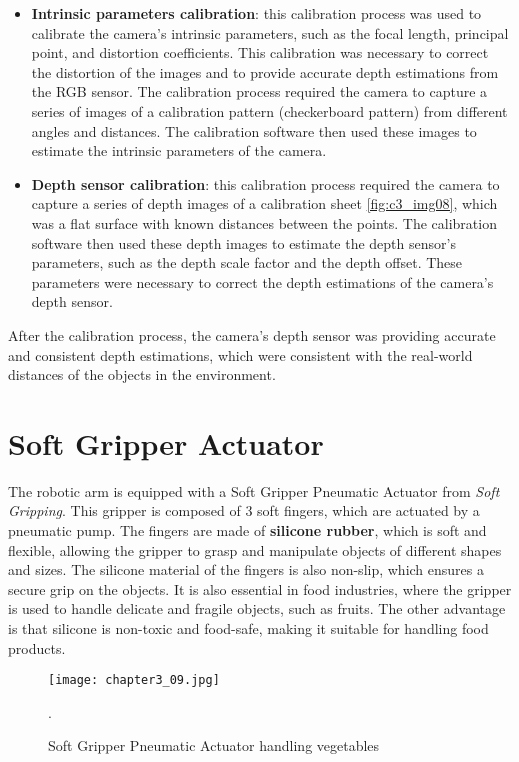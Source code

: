 \begin{itemize}
    \item \textbf{Intrinsic parameters calibration}: this calibration process was used to calibrate the camera's 
    intrinsic parameters,
    such as the focal length, principal point, and distortion coefficients. This calibration was necessary to correct
    the distortion of the images and to provide accurate depth estimations from the RGB sensor. The calibration process
    required the camera to capture a series of images of a calibration pattern (checkerboard pattern) from different angles
    and distances. The calibration software then used these images to estimate the intrinsic parameters of the camera.
    \item \textbf{Depth sensor calibration}: this calibration process required the camera to capture a series of
    depth images of a calibration sheet \ref{fig:c3_img08}, which was a flat surface with known distances between the points.
    The calibration software then used these depth images to estimate the depth sensor's parameters, 
    such as the depth scale factor and the depth offset. 
    These parameters were necessary to correct the depth estimations of the camera's depth sensor.
\end{itemize}


After the calibration process, the camera's depth sensor was providing accurate and consistent depth estimations,
which were consistent with the real-world distances of the objects in the environment.

\section{Soft Gripper Actuator}

The robotic arm is equipped with a Soft Gripper Pneumatic Actuator from \textit{Soft Gripping}.
This gripper is composed of 3 soft fingers, which are actuated by a pneumatic pump. The fingers are made of
\textbf{silicone rubber}, which is soft and flexible, allowing the gripper to grasp and manipulate objects of different shapes
and sizes. The silicone material of the fingers is also non-slip, which ensures a secure grip on the objects.
It is also essential in food industries, where the gripper is used to handle delicate and fragile objects, 
such as fruits. The other advantage is that silicone is non-toxic and food-safe, making it suitable for handling
food products.

\begin{figure}[t]
    \centering
    \texttt{[image: chapter3\_09.jpg]}
    \captionsetup{width=1\linewidth}
    \caption{Soft Gripper Pneumatic Actuator handling vegetables}.
    \label{fig:c3_img09}
\end{figure}

